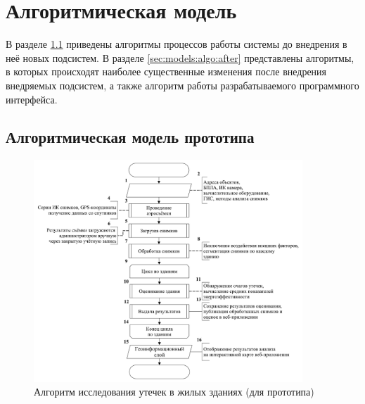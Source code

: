 \section{Алгоритмическая модель}
\label{sec:models:algo}
	
\par
	В разделе \ref{sec:models:algo:before} приведены алгоритмы процессов работы системы до внедрения в неё новых подсистем. В разделе \ref{sec:models:algo:after} представлены алгоритмы, в которых происходят наиболее существенные изменения после внедрения внедряемых подсистем, а также алгоритм работы разрабатываемого программного интерфейса.

\pagebreak

\subsection{Алгоритмическая модель прототипа}
\label{sec:models:algo:before}

	\begin{figure}[h!]
      \centering
      \includegraphics[width=0.9\textwidth]{images/am/am0_before}
      \caption{Алгоритм исследования утечек в жилых зданиях (для прототипа)}
      \label{am:before:common}
    \end{figure}

\pagebreak


